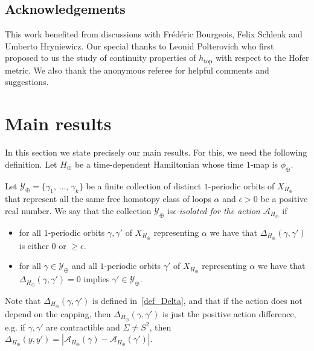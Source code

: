 \documentclass[AHL,Unicode,longabstracts,published]{cedram}
\newcommand{\topo}{\mathrm{top}}
\newcommand{\clY}{\mathcal{Y}}
\newcommand{\clA}{\mathcal{A}}
\newcommand{\topo}{\mathrm{top}}
\begin{document}
\subsection*{Acknowledgements}
This work benefited from discussions with Frédéric Bourgeois, Felix Schlenk and Umberto Hryniewicz. Our special thanks to Leonid Polterovich who first proposed to us the study of continuity properties of $h_{\topo}$ with respect to the Hofer metric. We also thank the anonymous referee for helpful comments and suggestions.


\section{Main results} \label{sec:mainresults}


In this section we state precisely our main results. For this, we need the following definition. Let $H_{\oplus}$ be a time-dependent Hamiltonian whose time $1$-map is $\phi_{\oplus}$.

\begin{defi} \label{def:isolated}
Let $\clY_\oplus=\{\gamma_1,\,\ldots,\,\gamma_k\}$ be a finite collection of distinct $1$-periodic orbits of $X_{H_\oplus}$ that represent all the same free homotopy class of loops $\alpha$ and $\epsilon>0$ be a positive real number. We say that the collection $\clY_\oplus$ is\emph{$\epsilon$-isolated for the action $\clA_{H_\oplus}$} if
\begin{itemize}
\item for all $1$-periodic orbits $\gamma,\gamma'$ of $X_{H_{\oplus}}$ representing $\alpha$ we have that $\Delta_{H_{\oplus}}(\gamma,\gamma')$ is either $0$ or $\geq\epsilon$.
\item for all $\gamma \in \clY_{\oplus}$ and all $1$-periodic orbits $\gamma'$ of $X_{H_{\oplus}}$ representing $\alpha$ we have that $\Delta_{H_{\oplus}}(\gamma, \gamma') = 0$ implies $\gamma'\in \clY_{\oplus}$.
\end{itemize}
\end{defi}

\begin{rema}
Note that $\Delta_{H_{\oplus}}(\gamma,\gamma')$ is defined in~\eqref{def_Delta}, and that if the action does not depend on the capping, then $\Delta_{H_{\oplus}}(\gamma,\gamma')$ is just the positive action difference, e.g. if $\gamma, \gamma'$ are contractible and $\Sigma \neq S^2$, then $\Delta_{H_{\oplus}}(y,y')=|\clA_{H_{\oplus}}(\gamma) -\clA_{H_{\oplus}}(\gamma')|$.
\end{rema}
\end{document}
